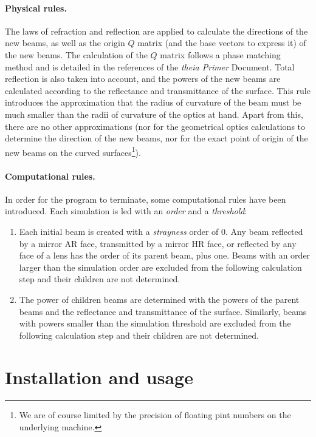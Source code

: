 \documentclass{article}
\begin{document}
\paragraph{Physical rules.}The laws of refraction and  reflection are applied to calculate the directions of the new beams, as well as the origin $Q$ matrix (and the base vectors to express it) of the new beams.  The calculation of the $Q$ matrix follows a phase matching method and is detailed in the references of the \textit{theia Primer} Document. Total reflection is also taken into account, and the powers of the new beams are calculated according to the reflectance and transmittance of the surface. This rule introduces the approximation that the radius of curvature of the beam must be much smaller than the radii of curvature of the optics at hand. Apart from this, there are no other approximations (nor for the geometrical optics calculations to determine the direction of the new beams, nor for the exact point of origin of the new beams on the curved surfaces\footnote{We are of course limited by the precision of floating pint numbers on the underlying machine.}). 

\paragraph{Computational rules.}In order for the program to terminate, some computational rules have been introduced. Each simulation is led with an \textit{order} and a \textit{threshold}:

\begin{enumerate}
\item Each initial beam is created with a \textit{strayness} order of 0. Any beam reflected by a mirror AR face, transmitted by a mirror HR face, or reflected by any face of a lens has the order of its parent beam, plus one. Beams with an order larger than the simulation order are excluded from the following calculation step and their children are not determined.

\item The power of children beams are determined with the powers of the parent beams and the reflectance and transmittance of the surface. Similarly, beams with powers smaller than the simulation threshold are excluded from the following calculation step and their children are not determined.

\end{enumerate}

\section{Installation and usage}
\end{document}
